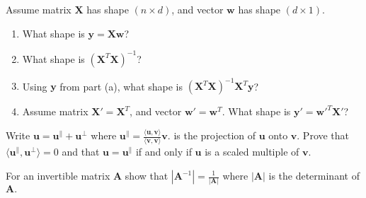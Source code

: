\documentclass{harvardml}
\theoremstyle{definition}
\theoremstyle{plain}
\renewcommand{\v}[1]{\mathbf{#1}}
\begin{document}
\begin{problem}

Assume matrix $\mathbf{X}$ has shape $(n \times d)$, and vector $\mathbf{w}$ has shape $(d \times 1)$.

\begin{enumerate}[label=(\alph*)]
		        
		        \item What shape is $\mathbf{y} =  \mathbf{X} \mathbf{w}$?
		        
		        \item What shape is $(\mathbf{X}^T \mathbf{X})^{-1}$?
		        
		        \item Using $\mathbf{y}$ from part (a), what shape is $(\mathbf{X}^T \mathbf{X})^{-1} \mathbf{X}^T \mathbf{y}$?
		        
		        \item Assume matrix $\mathbf{X}' = \mathbf{X}^T$, and vector $\mathbf{w}' = \mathbf{w}^T$.  What shape is $\mathbf{y}' = \mathbf{w}'^T \mathbf{X}'$?  

		    \end{enumerate}

\end{problem}

\begin{problem}
        Write $\mathbf{u} = \mathbf{u}^\parallel + \mathbf{u^\perp}$ where $\mathbf{u}^\parallel = \frac{\langle \v u, \v v \rangle}
				{\langle \v v, \v v \rangle} \v v$. is the projection of $\v u$ onto $\v v$. Prove that $\langle \mathbf{u}^\parallel,
		\mathbf{u^\perp} \rangle = 0$ and that $\v u = \mathbf{u}^\parallel$ if and only if $\v u$ is a scaled multiple of $\v v$.
        \end{problem}


\begin{problem}
                For an invertible matrix $\mathbf{A}$ show that $|\mathbf{A}^{-1}| = \frac{1}{|\mathbf A|}$ where $|\mathbf A|$ is the determinant of $\mathbf{A}.$
                
                
\end{problem}
        
        
        
\end{document}
